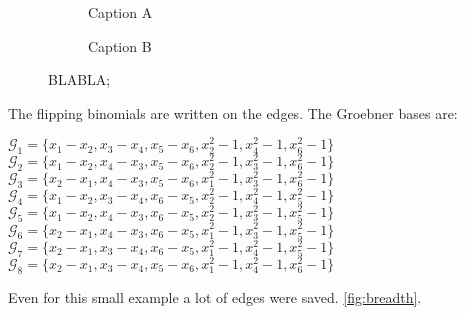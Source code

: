 \begin{figure}
    \centering
    \begin{subfigure}[b]{0.48\linewidth}        %
        \centering
        
        \caption{Caption A}
        \label{fig:A}
    \end{subfigure}
    \begin{subfigure}[b]{0.48\linewidth}        %
        \centering
        
        \caption{Caption B}
        \label{fig:B}
    \end{subfigure}
    \caption{BLABLA;}
    \label{fig:roc_curve}
\end{figure}













The flipping binomials are written on the edges.
The Groebner bases are:
\begin{center}
$\mathcal{G}_{1} = \{x_{1}-x_{2},x_{3}-x_{4},x_{5}-x_{6},x_{2}^{2}-1,x_{4}^{2}-1,x_{6}^{2}-1 \} $ \\
$\mathcal{G}_{2} = \{x_{1}-x_{2},x_{4}-x_{3},x_{5}-x_{6},x_{2}^{2}-1,x_{3}^{2}-1,x_{6}^{2}-1 \} $ \\
$\mathcal{G}_{3} = \{x_{2}-x_{1},x_{4}-x_{3},x_{5}-x_{6},x_{1}^{2}-1,x_{3}^{2}-1,x_{6}^{2}-1 \} $ \\
$\mathcal{G}_{4} = \{x_{1}-x_{2},x_{3}-x_{4},x_{6}-x_{5},x_{2}^{2}-1,x_{4}^{2}-1,x_{5}^{2}-1 \} $ \\
$\mathcal{G}_{5} = \{x_{1}-x_{2},x_{4}-x_{3},x_{6}-x_{5},x_{2}^{2}-1,x_{3}^{2}-1,x_{5}^{2}-1 \} $ \\
$\mathcal{G}_{6} = \{x_{2}-x_{1},x_{4}-x_{3},x_{6}-x_{5},x_{1}^{2}-1,x_{3}^{2}-1,x_{5}^{2}-1 \} $ \\
$\mathcal{G}_{7} = \{x_{2}-x_{1},x_{3}-x_{4},x_{6}-x_{5},x_{1}^{2}-1,x_{4}^{2}-1,x_{5}^{2}-1 \} $ \\
$\mathcal{G}_{8} = \{x_{2}-x_{1},x_{3}-x_{4},x_{5}-x_{6},x_{1}^{2}-1,x_{4}^{2}-1,x_{6}^{2}-1 \} $ \\
\end{center}




Even for this small example a lot of edges were saved.
\ref{fig:breadth}.


